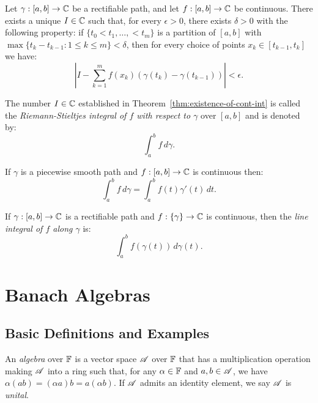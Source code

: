\documentclass[reqno]{amsart}
\begin{document}
\begin{theorem}\label{thm:existence-of-cont-int}
	Let $\gamma:[a,b] \rightarrow \mathbb{C}$ be a rectifiable path, and let $f:[a,b] \rightarrow \mathbb{C}$ be continuous. There exists a unique $I \in \mathbb{C}$ such that, for every $\epsilon > 0$, there exists $\delta > 0$ with the following property: if $\{t_0 < t_1,\ldots, <t_m\}$ is a partition of $[a,b]$ with $\max \{t_k - t_{k-1} : 1 \leq k \leq m \} < \delta$, then for every choice of points $x_k \in [t_{k-1},t_k]$ we have:
	\[
		\left| I - \sum_{k = 1}^{m}  f(x_k) \left( \gamma(t_k) - \gamma(t_{k-1}) \right)  \right| < \epsilon.
	\] 
\end{theorem}

\begin{definition}
	The number $I \in \mathbb{C}$ established in Theorem~\ref{thm:existence-of-cont-int} is called the \emph{Riemann-Stieltjes integral of $f$ with respect to $\gamma$} over $[a,b]$ and is denoted by:
	\[
		\int_{a}^{b} f\,d\gamma.
	\] 
\end{definition}

\begin{theorem}
	If $\gamma$ is a piecewise smooth path and $f:[a,b] \rightarrow \mathbb{C}$ is continuous then:
	\[
		\int_{a}^{b} f\,d \gamma = \int_{a}^{b} f(t) \gamma'(t)\,dt.
	\] 
\end{theorem}

\begin{definition}
	If $\gamma:[a,b] \rightarrow \mathbb{C}$ is a rectifiable path and $f:\{\gamma\} \rightarrow \mathbb{C}$ is continuous, then the \emph{line integral of $f$ along $\gamma$} is:
	\[
		\int_{a}^{b} f(\gamma(t))\,d\gamma(t).	
	\] 
\end{definition}

\fi
\section{Banach Algebras}\label{Section:Banach Algebras}

\subsection{Basic Definitions and Examples}

\begin{definition}
	An \emph{algebra} over $\mathbb{F}$ is a vector space $\mathscr{A}$ over $\mathbb{F}$ that has a multiplication operation making $\mathscr{A}$ into a ring such that, for any $\alpha \in \mathbb{F}$ and $a,b \in \mathscr{A}$, we have $\alpha(ab) = (\alpha a)b = a (\alpha b)$. If $\mathscr{A}$ admits an identity element, we say $\mathscr{A}$ is \emph{unital}.
\end{definition}
\end{document}

